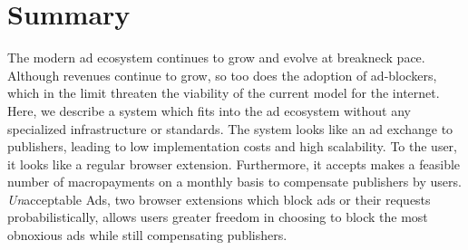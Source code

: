 \section{Summary}
The modern ad ecosystem continues to grow and evolve at breakneck pace.
Although revenues continue to grow, so too does the adoption of ad-blockers, which in the limit threaten the viability of the current model for the internet.
Here, we describe a system which fits into the ad ecosystem without any specialized infrastructure or standards.
The system looks like an ad exchange to publishers, leading to low implementation costs and high scalability.
To the user, it looks like a regular browser extension.
Furthermore, it accepts makes a feasible number of macropayments on a monthly basis to compensate publishers by users.
\textit{Un}acceptable Ads, two browser extensions which block ads or their requests probabilistically, allows users greater freedom in choosing to block the most obnoxious ads while still compensating publishers.